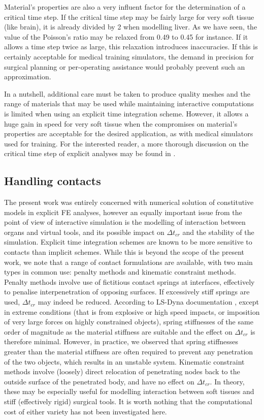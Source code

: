 Material's properties are also a very influent factor for the determination of a critical time step. If the critical time step may be fairly large for very soft tissue (like brain), it is already divided by 2 when modelling liver. As we have seen, the value of the Poisson's ratio may be relaxed from 0.49 to 0.45 for instance. If it allows a time step twice as large, this relaxation introduces inaccuracies. If this is certainly acceptable for medical training simulators, the demand in precision for surgical planning or per-operating assistance would probably prevent such an approximation. 

In a nutshell, additional care must be taken to produce quality meshes and the range of materials that may be used while maintaining interactive computations is limited when using an explicit time integration scheme. However, it allows a huge gain in speed for very soft tissue when the compromises on material's properties are acceptable for the desired application, as with medical simulators used for training. For the interested reader, a more thorough discussion on the critical time step of explicit analyses may be found in \cite{Taylor08}. 


	\subsection{Handling contacts}
The present work was entirely concerned with numerical solution of constitutive models in explicit FE analyses, however an equally important issue from the point of view of interactive simulation is the modelling of interaction between organs and virtual tools, and its possible impact on $ \Delta t_{cr} $ and the stability of the simulation. Explicit time integration schemes are known to be more sensitive to contacts than implicit schemes. While this is beyond the scope of the present work, we note that a range of contact formulations are available, with two main types in common use: penalty methods and kinematic constraint methods. Penalty methods involve use of fictitious contact springs at interfaces, effectively to penalise interpenetration of opposing surfaces. If excessively stiff springs are used, $ \Delta t_{cr} $ may indeed be reduced. \ON According to LS-Dyna documentation \citep{Hallquist06},  \OFF except in extreme conditions (that is from explosive or high speed impacts, or imposition of very large forces on highly constrained objects), spring stiffnesses of the same order of magnitude as the material stiffness are suitable and the effect on $ \Delta t_{cr} $ is therefore minimal. \ON However, in practice, we observed that spring stiffnesses greater than the material stiffness are often required to prevent any penetration of the two objects, which results in an unstable system. \OFF Kinematic constraint methods involve (loosely) direct relocation of penetrating nodes back to the outside surface of the penetrated body, and have no effect on $ \Delta t_{cr} $. \ON In theory, \OFF these may be especially useful for modelling interaction between soft tissues and stiff (effectively rigid) surgical tools. \ON It is worth nothing that \OFF the computational cost of either variety has not been investigated here. 


